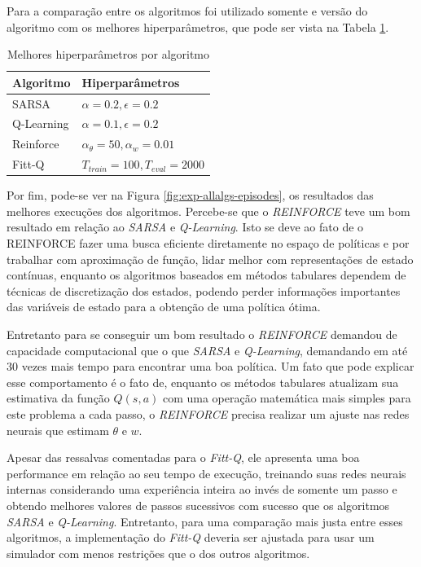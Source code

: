 \documentclass[letterpaper]{article}
\begin{document}
Para a comparação entre os algoritmos foi utilizado somente e versão do algoritmo com os melhores hiperparâmetros, que pode ser vista na Tabela \ref{table:best-hyperparameters}. 

\begin{table}[ht]
  \caption{Melhores hiperparâmetros por algoritmo}
  \label{table:best-hyperparameters}
  \begin{tabular}{ll}
      \toprule
      Algoritmo  &                           Hiperparâmetros \\
      \midrule
      SARSA      &          $ \alpha = 0.2, \epsilon = 0.2 $ \\
      Q-Learning &          $ \alpha = 0.1, \epsilon = 0.2 $ \\
      Reinforce  & $ \alpha_{\theta} = 50, \alpha_w = 0.01 $ \\
      Fitt-Q     &      $ T_{train} = 100, T_{eval} = 2000 $ \\
      \bottomrule
  \end{tabular}
\end{table}

Por fim, pode-se ver na Figura \ref{fig:exp-allalgs-episodes}, os resultados das melhores execuções dos algoritmos. Percebe-se que o \textit{REINFORCE} teve um bom resultado em relação ao \textit{SARSA} e \textit{Q-Learning}. Isto se deve ao fato de o REINFORCE fazer uma busca eficiente diretamente no espaço de políticas e por trabalhar com aproximação de função, lidar melhor com representações de estado contínuas, enquanto os algoritmos  baseados em métodos tabulares dependem de técnicas de discretização dos estados, podendo perder informações importantes das variáveis de estado para a obtenção de uma política ótima.

Entretanto para se conseguir um bom resultado o \textit{REINFORCE} demandou de capacidade computacional que o que \textit{SARSA} e \textit{Q-Learning}, demandando em até 30 vezes mais tempo para encontrar uma boa política. Um fato que pode explicar esse comportamento é o fato de, enquanto os métodos tabulares atualizam sua estimativa da função $Q(s,a)$ com uma operação matemática mais simples para este problema a cada passo, o \textit{REINFORCE} precisa realizar um ajuste nas redes neurais que estimam $\theta$ e $w$.

Apesar das ressalvas comentadas para o \textit{Fitt-Q}, ele apresenta uma boa performance em relação ao seu tempo de execução, treinando suas redes neurais internas considerando uma experiência inteira ao invés de somente um passo e obtendo melhores valores de passos sucessivos com sucesso que os algoritmos \textit{SARSA} e \textit{Q-Learning}. Entretanto, para uma comparação mais justa entre esses algoritmos, a implementação do \textit{Fitt-Q} deveria ser ajustada para usar um simulador com menos restrições que o dos outros algoritmos.
\end{document}
